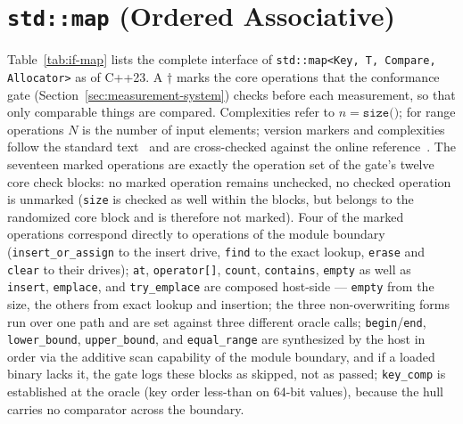 \section{\texttt{std::map} (Ordered Associative)}\label{asec:if-map}
Table~\ref{tab:if-map} lists the complete interface of
\texttt{std::map<Key,\,T,\,Compare,\,Allocator>} as of C++23. A $\dagger$ marks the core operations
that the conformance gate (Section~\ref{sec:measurement-system}) checks before each measurement,
so that only comparable things are compared. Complexities refer to $n=\texttt{size()}$; for range
operations $N$ is the number of input elements; version markers and complexities follow the
standard text~\cite{iso_cpp} and are cross-checked against the online
reference~\cite{cppreference_map}. The seventeen marked operations are exactly the operation set of
the gate's twelve core check blocks: no marked operation remains unchecked, no checked operation is
unmarked (\texttt{size} is checked as well within the blocks, but belongs to the randomized core
block and is therefore not marked). Four of the marked operations correspond directly to operations
of the module boundary (\texttt{insert\_or\_assign} to the insert drive, \texttt{find} to the exact
lookup, \texttt{erase} and \texttt{clear} to their drives); \texttt{at}, \texttt{operator[]},
\texttt{count}, \texttt{contains}, \texttt{empty} as well as \texttt{insert}, \texttt{emplace}, and
\texttt{try\_emplace} are composed host-side --- \texttt{empty} from the size, the others from
exact lookup and insertion; the three non-overwriting forms run over one path and are set against
three different oracle calls; \texttt{begin}/\texttt{end}, \texttt{lower\_bound},
\texttt{upper\_bound}, and \texttt{equal\_range} are synthesized by the host in order via the
additive scan capability of the module boundary, and if a loaded binary lacks it, the gate logs
these blocks as skipped, not as passed; \texttt{key\_comp} is established at the oracle (key order
less-than on 64-bit values), because the hull carries no comparator across the boundary.

